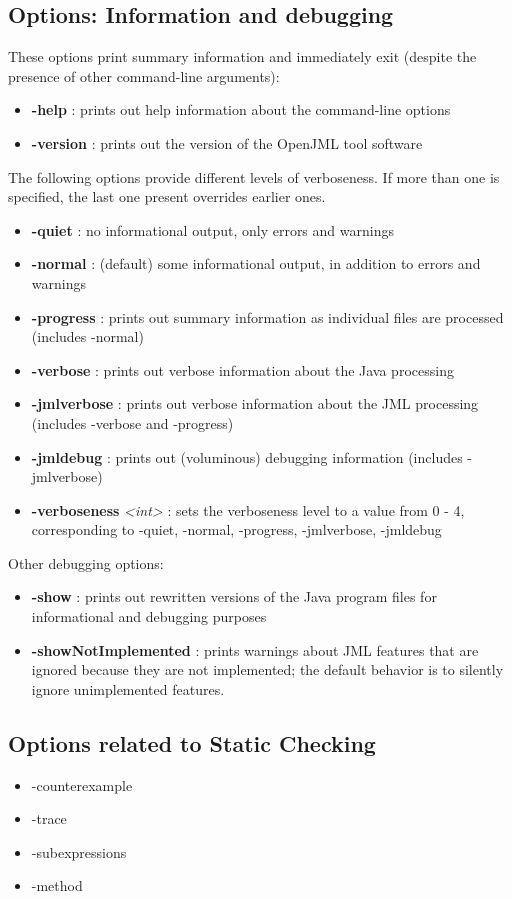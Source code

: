 \documentclass{report}%
\begin{document}
\subsection{Options: Information and debugging}
\label{OptionsDebugging}
These options print summary information and immediately exit (despite the presence of other command-line arguments):
\begin{itemize}
\item \textbf{-help} : prints out help information about the command-line options
\item \textbf{-version} : prints out the version of the OpenJML tool software
\end{itemize}
The following options provide different levels of verboseness. If more than one is specified, the last one present overrides earlier ones.
\begin{itemize}
\item \textbf{-quiet} : no informational output, only errors and warnings
\item \textbf{-normal} : (default) some informational output, in addition to errors and warnings
\item \textbf{-progress} : prints out summary information as individual files are processed (includes -normal)
\item \textbf{-verbose} : prints out verbose information about the Java processing
\item \textbf{-jmlverbose} : prints out verbose information about the JML processing (includes -verbose and -progress)
\item \textbf{-jmldebug} : prints out (voluminous) debugging information (includes -jmlverbose)
\item \textbf{-verboseness} {\it <int>} : sets the verboseness level to a value from 0 - 4, corresponding to -quiet, -normal, -progress, -jmlverbose, -jmldebug
\end{itemize}

Other debugging options:
\begin{itemize}
\item \textbf{-show} : prints out rewritten versions of the Java program files for informational and debugging purposes
\item \textbf{-showNotImplemented} : prints warnings about JML features that are ignored because they are not implemented; the default behavior is to silently ignore unimplemented features.
\end{itemize}


\subsection{Options related to Static Checking}
\begin{itemize}
\item -counterexample
\item -trace
\item -subexpressions
\item -method
\end{itemize}
\end{document}
